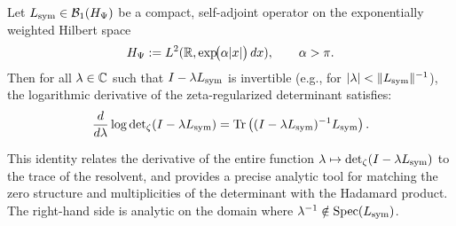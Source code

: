 \begin{lemma}
\label{lem:A_log_derivative}
Let \( L_{\mathrm{sym}} \in \mathcal{B}_1(H_{\Psi}) \) be a compact, self-adjoint operator on the exponentially weighted Hilbert space
\[
H_{\Psi} := L^2(\mathbb{R}, \exp\!\bigl(\alpha |x|\bigr) \, dx), \qquad \alpha > \pi.
\]
Then for all \( \lambda \in \mathbb{C} \) such that \( I - \lambda L_{\mathrm{sym}} \) is invertible (e.g., for \( |\lambda| < \|L_{\mathrm{sym}}\|^{-1} \)), the logarithmic derivative of the zeta-regularized determinant satisfies:
\[
\frac{d}{d\lambda} \log \det\nolimits_\zeta(I - \lambda L_{\mathrm{sym}})
= \operatorname{Tr} \left( (I - \lambda L_{\mathrm{sym}})^{-1} L_{\mathrm{sym}} \right).
\]

\medskip
\noindent
This identity relates the derivative of the entire function \( \lambda \mapsto \det\nolimits_\zeta(I - \lambda L_{\mathrm{sym}}) \) to the trace of the resolvent, and provides a precise analytic tool for matching the zero structure and multiplicities of the determinant with the Hadamard product. The right-hand side is analytic on the domain where \( \lambda^{-1} \notin \operatorname{Spec}(L_{\mathrm{sym}}) \).
\end{lemma}
